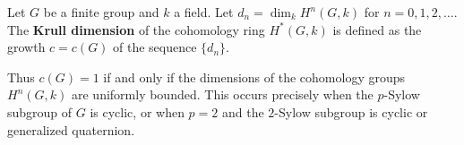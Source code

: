 \begin{definition}
\label{def:krull-dimension-cohomology-ring}
Let $G$ be a finite group and $k$ a field. Let $d_n = \dim_k H^n(G, k)$ for $n = 0, 1, 2, \ldots$. The \textbf{Krull dimension} of the cohomology ring $H^*(G, k)$ is defined as the growth $c = c(G)$ of the sequence $\{d_n\}$.

Thus $c(G) = 1$ if and only if the dimensions of the cohomology groups $H^n(G, k)$ are uniformly bounded. This occurs precisely when the $p$-Sylow subgroup of $G$ is cyclic, or when $p = 2$ and the $2$-Sylow subgroup is cyclic or generalized quaternion.
\end{definition}
